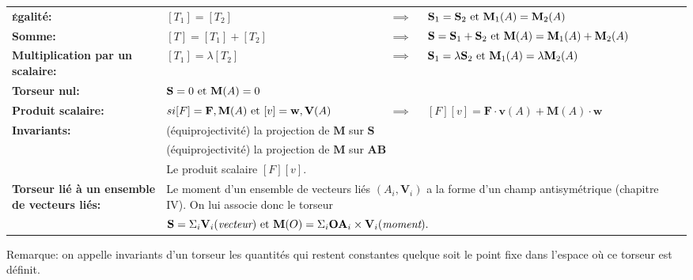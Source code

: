\begin{flushleft}
\begin{spacing}{1.5}
\begin{tabular}{ l l c p{5cm} }
  \textbf{\textsc{é}galité:}
  & $[T_{1}]=[T_{2}]$ & $\implies$ & $\mathbf{S}_{1}=\mathbf{S}_{2} \textnormal{ et } \mathbf{M}_{1}(A)=\mathbf{M}_{2}(A)$ \\
  \textbf{Somme:}
  & $[T]=[T_{1}]+[T_{2}]$ & $\implies$ & $\mathbf{S}=\mathbf{S}_{1}+\mathbf{S}_{2} \textnormal{ et } \mathbf{M}(A)=\mathbf{M}_{1}(A)+\mathbf{M}_{2}(A)$ \\
  \textbf{Multiplication par un scalaire:}
  & $[T_{1}]=\lambda [T_{2}]$ & $\implies$ & $\mathbf{S}_{1}=\lambda \mathbf{S}_{2} \textnormal{ et } \mathbf{M}_{1}(A)=\lambda \mathbf{M}_{2}(A)$ \\
  \textbf{Torseur nul:}
  & \multicolumn{3}{l}{$\mathbf{S}=0 \textnormal{ et } \mathbf{M}(A)=0$} \\
  \textbf{Produit scalaire:}
  & $si [F]={\mathbf{F},\mathbf{M}(A)} \textnormal{ et } [v]={\mathbf{w},\mathbf{V}(A)}$ & $\implies$ & $[F][v] = \mathbf{F} \cdot \mathbf{v}(A) + \mathbf{M}(A) \cdot \mathbf{w}$ \\
  \textbf{Invariants:}
  & \multicolumn{3}{l}{(équiprojectivité) la projection de $\mathbf{M}$ sur $\mathbf{S}$} \\
  & \multicolumn{3}{l}{(équiprojectivité) la projection de $\mathbf{M}$ sur $\mathbf{AB}$} \\
  & \multicolumn{3}{l}{Le produit scalaire $[F][v]$.} \\
  \multicolumn{1}{p{6cm}}{\textbf{Torseur lié à un ensemble de vecteurs liés:}}
  & \multicolumn{3}{p{10cm}}{Le moment d'un ensemble de vecteurs liés ${(A_{i},\mathbf{V}_{i})}$ a la forme d'un champ antisymétrique \cite{bib_champVecteurs} (chapitre IV). On lui associe donc
  le torseur} \\
  & \multicolumn{3}{l}{$\mathbf{S}=\Sigma_{i}\mathbf{V}_{i} (\emph{vecteur}) \textnormal{ et } \mathbf{M}(O)=\Sigma_{i}\mathbf{OA}_{i} \times \mathbf{V}_{i} (\emph{moment}).$} \\
\end{tabular}
\end{spacing}
\end{flushleft}


Remarque: on appelle invariants d'un torseur les quantités qui restent constantes quelque soit le point fixe dans l'espace où ce torseur est définit.

